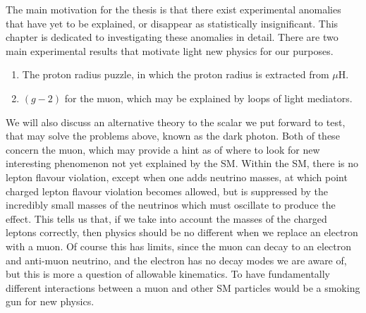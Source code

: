 \label{chapter:review}

The main motivation for the thesis is that there exist experimental anomalies that have yet to be explained, or disappear as statistically insignificant.
This chapter is dedicated to investigating these anomalies in detail.
There are two main experimental results that motivate light new physics for our purposes.

\begin{enumerate}
    \item The proton radius puzzle, in which the proton radius is extracted from $\mu\textrm{H}$.
    \item $(g-2)$ for the muon, which may be explained by loops of light mediators.
\end{enumerate}

We will also discuss an alternative theory to the scalar we put forward to test, that may solve the problems above, known as the dark photon.
Both of these concern the muon, which may provide a hint as of where to look for new interesting phenomenon not yet explained by the SM.
Within the SM, there is no lepton flavour violation, except when one adds neutrino masses, at which point charged lepton flavour violation becomes allowed, but is suppressed by the incredibly small masses of the neutrinos which must oscillate to produce the effect.
This tells us that, if we take into account the masses of the charged leptons correctly, then physics should be no different when we replace an electron with a muon.
Of course this has limits, since the muon can decay to an electron and anti-muon neutrino, and the electron has no decay modes we are aware of, but this is more a question of allowable kinematics.
To have fundamentally different interactions between a muon and other SM particles would be a smoking gun for new physics.




